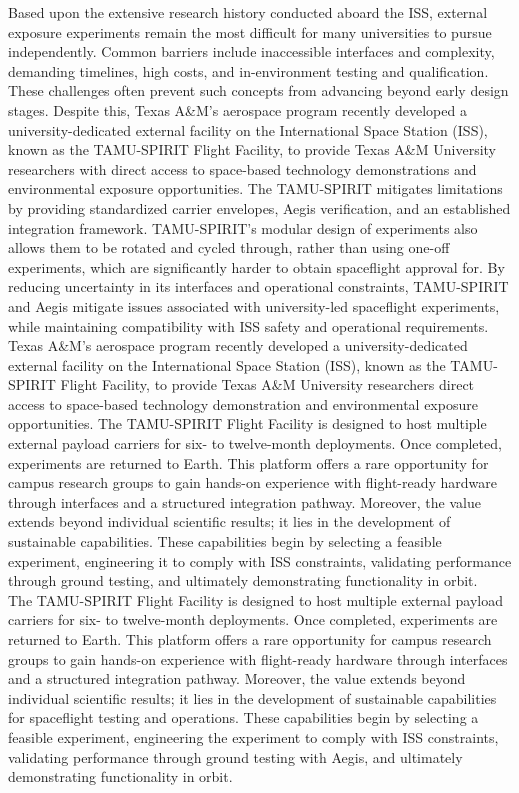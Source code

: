 \documentclass[conf]{new-aiaa}
\begin{document}
Based upon the extensive research history conducted aboard the ISS, external exposure experiments remain the most difficult for many universities to pursue independently.
Common barriers include inaccessible interfaces and complexity, demanding timelines, high costs, and in-environment testing and qualification.
These challenges often prevent such concepts from advancing beyond early design stages.
Despite this, Texas A\&M's aerospace program recently developed a university-dedicated external facility on the International Space Station (ISS), known as the TAMU-SPIRIT Flight Facility, to provide Texas A\&M University researchers with direct access to space-based technology demonstrations and environmental exposure opportunities.
The TAMU-SPIRIT mitigates limitations by providing standardized carrier envelopes, Aegis verification, and an established integration framework.
TAMU-SPIRIT's modular design of experiments also allows them to be rotated and cycled through, rather than using one-off experiments, which are significantly harder to obtain spaceflight approval for.
By reducing uncertainty in its interfaces and operational constraints, TAMU-SPIRIT and Aegis mitigate issues associated with university-led spaceflight experiments, while maintaining compatibility with ISS safety and operational requirements. \\

Texas A\&M's aerospace program recently developed a university-dedicated external facility on the International Space Station (ISS), known as the TAMU-SPIRIT Flight Facility, to provide Texas A\&M University researchers direct access to space-based technology demonstration and environmental exposure opportunities.
The TAMU-SPIRIT Flight Facility is designed to host multiple external payload carriers for six- to twelve-month deployments.
Once completed, experiments are returned to Earth.
This platform offers a rare opportunity for campus research groups to gain hands-on experience with flight-ready hardware through interfaces and a structured integration pathway.
Moreover, the value extends beyond individual scientific results; it lies in the development of sustainable capabilities.
These capabilities begin by selecting a feasible experiment, engineering it to comply with ISS constraints, validating performance through ground testing, and ultimately demonstrating functionality in orbit. \\

The TAMU-SPIRIT Flight Facility is designed to host multiple external payload carriers for six- to twelve-month deployments.
Once completed, experiments are returned to Earth.
This platform offers a rare opportunity for campus research groups to gain hands-on experience with flight-ready hardware through interfaces and a structured integration pathway.
Moreover, the value extends beyond individual scientific results; it lies in the development of sustainable capabilities for spaceflight testing and operations.
These capabilities begin by selecting a feasible experiment, engineering the experiment to comply with ISS constraints, validating performance through ground testing with Aegis, and ultimately demonstrating functionality in orbit. \\
\end{document}
